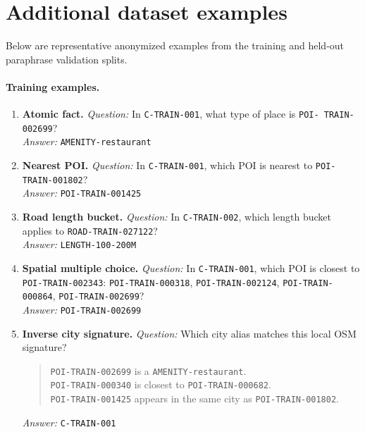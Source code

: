 \documentclass[11pt]{article}
\begin{document}
\section{Additional dataset examples}
\label{app:dataset-examples}

Below are representative anonymized examples from the training and held-out paraphrase
validation splits.

\paragraph{Training examples.}
\begin{enumerate}
    \item \textbf{Atomic fact.}
    \textit{Question:} In \texttt{C-TRAIN-001}, what type of place is \texttt{POI-
TRAIN-002699}? \\
    \textit{Answer:} \texttt{AMENITY-restaurant}

    \item \textbf{Nearest POI.}
    \textit{Question:} In \texttt{C-TRAIN-001}, which POI is nearest to \texttt{POI-
TRAIN-001802}? \\
    \textit{Answer:} \texttt{POI-TRAIN-001425}

    \item \textbf{Road length bucket.}
    \textit{Question:} In \texttt{C-TRAIN-002}, which length bucket applies to
\texttt{ROAD-TRAIN-027122}? \\
    \textit{Answer:} \texttt{LENGTH-100-200M}

    \item \textbf{Spatial multiple choice.}
    \textit{Question:} In \texttt{C-TRAIN-001}, which POI is closest to 
    \texttt{POI-TRAIN-002343}: \texttt{POI-TRAIN-000318}, \texttt{POI-TRAIN-002124}, 
    \texttt{POI-TRAIN-000864}, \texttt{POI-TRAIN-002699}? \\
    \textit{Answer:} \texttt{POI-TRAIN-002699}

    \item \textbf{Inverse city signature.}
    \textit{Question:} Which city alias matches this local OSM signature?
    \begin{quote}
    \texttt{POI-TRAIN-002699} is a \texttt{AMENITY-restaurant}. \\
    \texttt{POI-TRAIN-000340} is closest to \texttt{POI-TRAIN-000682}. \\
    \texttt{POI-TRAIN-001425} appears in the same city as \texttt{POI-TRAIN-001802}.
    \end{quote}
    \textit{Answer:} \texttt{C-TRAIN-001}
\end{enumerate}
\end{document}
